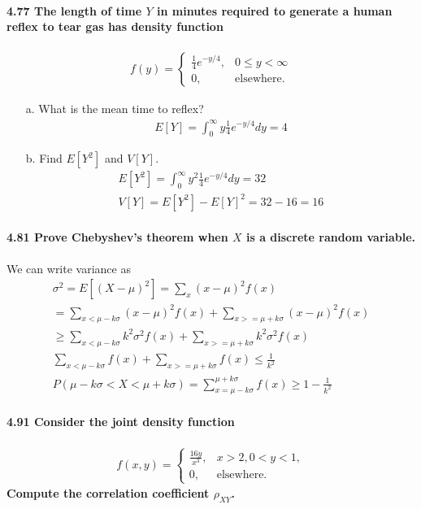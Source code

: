 \documentclass{article}
\begin{document}
\paragraph{4.77 The length of time $Y$ in minutes required to generate a human 
reflex to tear gas has density function}
\begin{eqnarray*}
f(y)=\left\{\begin{array}{ll}
	\frac{1}{4}e^{-y/4}, & 0\leq y< \infty\\
	0, & \mbox{elsewhere.}
	\end{array}\right.
\end{eqnarray*}
\begin{enumerate}
\item[a.] What is the mean time to reflex?
\begin{eqnarray*}
E[Y] = \int_0^\infty y\frac{1}{4}e^{-y/4}dy = \boxed{4}
\end{eqnarray*}

\item[b.] Find $E[Y^2]$ and $V[Y]$.
\begin{eqnarray*}
E[Y^2] = \int_0^\infty y^2\frac{1}{4}e^{-y/4}dy = \boxed{32}\\
V[Y] = E[Y^2]-E[Y]^2 = 32-16=\boxed{16}
\end{eqnarray*}

\end{enumerate}

\paragraph{4.81 Prove Chebyshev's theorem when $X$ is a discrete random variable.\\}
We can write variance as
\begin{eqnarray}
\sigma^2=E[(X-\mu)^2]=\sum_x(x-\mu)^2f(x)\\
	= \sum_{x<\mu-k\sigma} (x-\mu)^2f(x) + \sum_{x>=\mu+k\sigma} (x-\mu)^2f(x)\\
	\geq \sum_{x<\mu-k\sigma} k^2\sigma^2f(x) + \sum_{x>=\mu+k\sigma} k^2\sigma^2f(x)\\
	\sum_{x<\mu-k\sigma} f(x) + \sum_{x>=\mu+k\sigma} f(x) \leq \frac{1}{k^2}\\
	P(\mu-k\sigma<X<\mu+k\sigma)=\sum_{x=\mu-k\sigma}^{\mu+k\sigma} f(x) \geq 1-\frac{1}{k^2}
\end{eqnarray}

\paragraph{4.91 Consider the joint density function}
\begin{eqnarray*}
f(x,y)=\left\{\begin{array}{ll}
	\frac{16y}{x^3},& x>2,0<y<1,\\
	0,& \mbox{elsewhere.}
	\end{array}\right.
\end{eqnarray*}
\textbf{Compute the correlation coefficient $\rho_{XY}$.}\\
\end{document}
